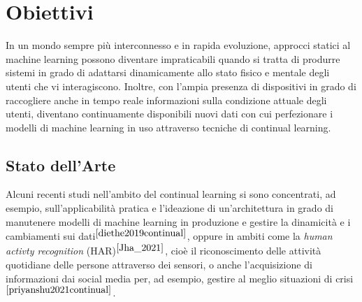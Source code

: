 \chapter{Obiettivi}
In un mondo sempre più interconnesso e in rapida evoluzione, approcci statici al machine learning possono diventare impraticabili quando si tratta di produrre sistemi in grado di adattarsi dinamicamente allo stato fisico e mentale degli utenti che vi interagiscono. Inoltre, con l'ampia presenza di dispositivi in grado di raccogliere anche in tempo reale informazioni sulla condizione attuale degli utenti, diventano continuamente disponibili nuovi dati con cui perfezionare i modelli di machine learning in uso attraverso tecniche di continual learning.
\section{Stato dell'Arte}
Alcuni recenti studi nell'ambito del continual learning si sono concentrati, ad esempio, sull'applicabilità pratica e l'ideazione di un'architettura in grado di manutenere modelli di machine learning in produzione e gestire la dinamicità e i cambiamenti sui dati$^{\cite{diethe2019continual}}$, oppure in ambiti come la \textit{human activty recognition} (HAR)$^{\cite{Jha_2021}}$, cioè il riconoscimento delle attività quotidiane delle persone attraverso dei sensori, o anche l'acquisizione di informazioni dai social media per, ad esempio, gestire al meglio situazioni di crisi$^{\cite{priyanshu2021continual}}$.